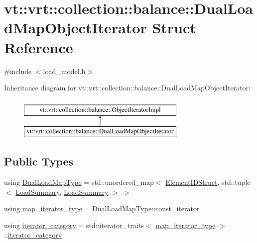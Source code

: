 \hypertarget{structvt_1_1vrt_1_1collection_1_1balance_1_1_dual_load_map_object_iterator}{}\section{vt\+:\+:vrt\+:\+:collection\+:\+:balance\+:\+:Dual\+Load\+Map\+Object\+Iterator Struct Reference}
\label{structvt_1_1vrt_1_1collection_1_1balance_1_1_dual_load_map_object_iterator}


{\ttfamily \#include $<$load\+\_\+model.\+h$>$}

Inheritance diagram for vt\+:\+:vrt\+:\+:collection\+:\+:balance\+:\+:Dual\+Load\+Map\+Object\+Iterator\+:\begin{figure}[H]
\begin{center}
\leavevmode
\includegraphics[height=2.000000cm]{structvt_1_1vrt_1_1collection_1_1balance_1_1_dual_load_map_object_iterator}
\end{center}
\end{figure}
\subsection*{Public Types}
\begin{DoxyCompactItemize}
\item 
using \hyperlink{structvt_1_1vrt_1_1collection_1_1balance_1_1_dual_load_map_object_iterator_a283605916dbc414bbc6e176b9f3fb240}{Dual\+Load\+Map\+Type} = std\+::unordered\+\_\+map$<$ \hyperlink{namespacevt_1_1vrt_1_1collection_1_1balance_a9f5b53fafb270212279a4757d2c4cd28}{Element\+I\+D\+Struct}, std\+::tuple$<$ \hyperlink{structvt_1_1vrt_1_1collection_1_1balance_1_1_load_summary}{Load\+Summary}, \hyperlink{structvt_1_1vrt_1_1collection_1_1balance_1_1_load_summary}{Load\+Summary} $>$ $>$
\item 
using \hyperlink{structvt_1_1vrt_1_1collection_1_1balance_1_1_dual_load_map_object_iterator_a86bac54b4dc71af6b0a7cf5aa7ced433}{map\+\_\+iterator\+\_\+type} = Dual\+Load\+Map\+Type\+::const\+\_\+iterator
\item 
using \hyperlink{structvt_1_1vrt_1_1collection_1_1balance_1_1_dual_load_map_object_iterator_a34d41afa8def298d663b106eee78dddf}{iterator\+\_\+category} = std\+::iterator\+\_\+traits$<$ \hyperlink{structvt_1_1vrt_1_1collection_1_1balance_1_1_dual_load_map_object_iterator_a86bac54b4dc71af6b0a7cf5aa7ced433}{map\+\_\+iterator\+\_\+type} $>$\+::\hyperlink{structvt_1_1vrt_1_1collection_1_1balance_1_1_dual_load_map_object_iterator_a34d41afa8def298d663b106eee78dddf}{iterator\+\_\+category}
\end{DoxyCompactItemize}
